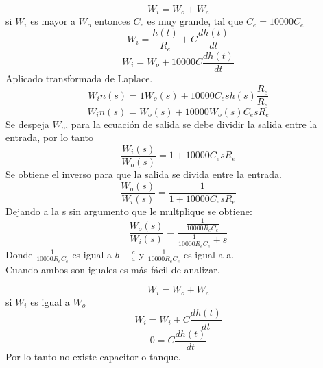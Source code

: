 \documentclass[12pt]{article}
\begin{document}
\begin{equation*}
W_i = W_o + W_c
\end{equation*}
si $W_i$ es mayor a $W_o$ entonces $C_e$ es muy grande, tal que $C_e = 10000C_e$
\begin{equation*}
W_i = \frac{h(t)}{R_e} + C\frac{dh(t)}{dt}
\end{equation*}
\begin{equation*}
W_i = W_o + 10000C\frac{dh(t)}{dt}
\end{equation*}
Aplicado transformada de Laplace.\\
\begin{equation*}
W_in(s) = 1W_o (s) + 10000C_e s h(s)\frac{R_e}{R_e}
\end{equation*}
\begin{equation*}
W_in (s) = W_o(s) + 10000W_o (s) C_e s R_e
\end{equation*}
Se despeja $W_o$, para la ecuación de salida se debe dividir la salida entre la entrada, por lo tanto\\
\begin{equation*}
\frac{W_i (s)}{W_o (s)} = 1 + 10000C_e s R_e
\end{equation*}
Se obtiene el inverso para que la salida se divida entre la entrada.\\
\begin{equation*}
\frac{W_o (s)}{W_i (s)} = \frac{1}{1 + 10000C_e s R_e}
\end{equation*}
Dejando a la s sin argumento que le multplique se obtiene:
\begin{equation*}
\frac{W_o (s)}{W_i (s)} = \frac{\frac{1}{10000R_e C_e}}{\frac{1}{10000R_e C_e} + s}
\end{equation*}
Donde $\frac{1}{10000R_e C_e}$ es igual a $b-\frac{c}{a}$ y $\frac{1}{10000R_e C_e}$ es igual a a.\\

Cuando ambos son iguales es más fácil de analizar.

\begin{equation*}
W_i = W_o + W_c
\end{equation*}
si $W_i$ es igual a $W_o$
\begin{equation*}
W_i = W_i + C\frac{dh(t)}{dt}
\end{equation*}
\begin{equation*}
0 = C\frac{dh(t)}{dt}
\end{equation*}
Por lo tanto no existe capacitor o tanque.\\
\\
\end{document}
